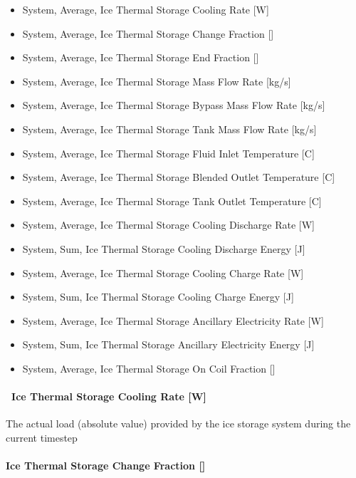 \begin{itemize}
\item
  System, Average, Ice Thermal Storage Cooling Rate {[}W{]}
\item
  System, Average, Ice Thermal Storage Change Fraction {[]}
\item
  System, Average, Ice Thermal Storage End Fraction {[]}
\item
  System, Average, Ice Thermal Storage Mass Flow Rate {[}kg/s{]}
\item
  System, Average, Ice Thermal Storage Bypass Mass Flow Rate {[}kg/s{]}
\item
  System, Average, Ice Thermal Storage Tank Mass Flow Rate {[}kg/s{]}
\item
  System, Average, Ice Thermal Storage Fluid Inlet Temperature {[}C{]}
\item
  System, Average, Ice Thermal Storage Blended Outlet Temperature {[}C{]}
\item
  System, Average, Ice Thermal Storage Tank Outlet Temperature {[}C{]}
\item
  System, Average, Ice Thermal Storage Cooling Discharge Rate {[}W{]}
\item
  System, Sum, Ice Thermal Storage Cooling Discharge Energy {[}J{]}
\item
  System, Average, Ice Thermal Storage Cooling Charge Rate {[}W{]}
\item
  System, Sum, Ice Thermal Storage Cooling Charge Energy {[}J{]}
\item
  System, Average, Ice Thermal Storage Ancillary Electricity Rate {[}W{]}
\item
  System, Sum, Ice Thermal Storage Ancillary Electricity Energy {[}J{]}
\item
  System, Average, Ice Thermal Storage On Coil Fraction {[]}
\end{itemize}

\paragraph{~Ice Thermal Storage Cooling Rate {[}W{]}}\label{ice-thermal-storage-cooling-rate-w}

The actual load (absolute value) provided by the ice storage system during the current timestep

\paragraph{Ice Thermal Storage Change Fraction {[]}}\label{ice-thermal-storage-change-fraction}

